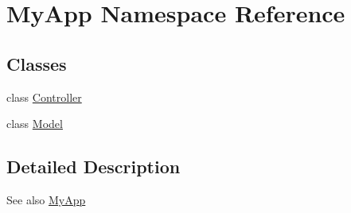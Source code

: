 \hypertarget{namespace_my_app}{}\section{My\+App Namespace Reference}
\label{namespace_my_app}
\subsection*{Classes}
\begin{DoxyCompactItemize}
\item 
class \hyperlink{class_my_app_1_1_controller}{Controller}
\item 
class \hyperlink{class_my_app_1_1_model}{Model}
\end{DoxyCompactItemize}


\subsection{Detailed Description}
\begin{DoxySeeAlso}{See also}
\hyperlink{namespace_my_app}{My\+App} 
\end{DoxySeeAlso}
